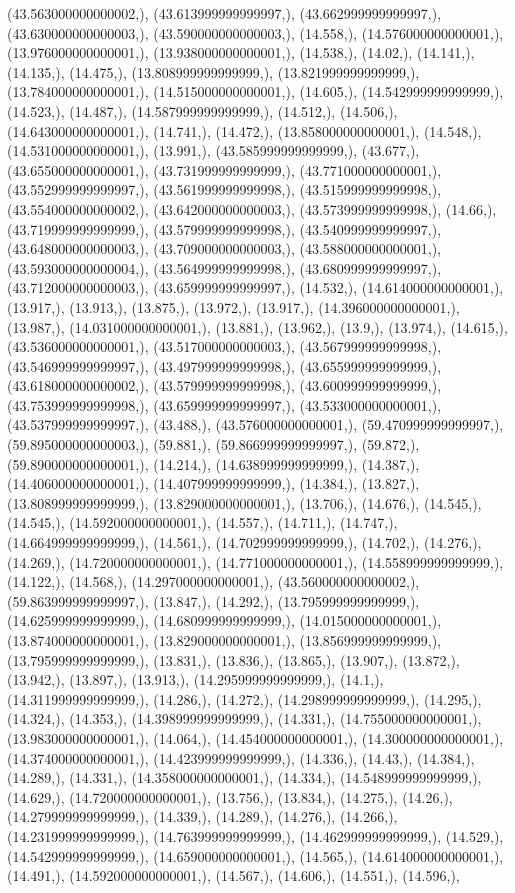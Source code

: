 \documentclass{article}
\begin{document}
(43.563000000000002,), (43.613999999999997,), (43.662999999999997,), (43.630000000000003,), (43.590000000000003,), (14.558,), (14.576000000000001,), (13.976000000000001,), (13.938000000000001,), (14.538,), (14.02,), (14.141,), (14.135,), (14.475,), (13.808999999999999,), (13.821999999999999,), (13.784000000000001,), (14.515000000000001,), (14.605,), (14.542999999999999,), (14.523,), (14.487,), (14.587999999999999,), (14.512,), (14.506,), (14.643000000000001,), (14.741,), (14.472,), (13.858000000000001,), (14.548,), (14.531000000000001,), (13.991,), (43.585999999999999,), (43.677,), (43.655000000000001,), (43.731999999999999,), (43.771000000000001,), (43.552999999999997,), (43.561999999999998,), (43.515999999999998,), (43.554000000000002,), (43.642000000000003,), (43.573999999999998,), (14.66,), (43.719999999999999,), (43.579999999999998,), (43.540999999999997,), (43.648000000000003,), (43.709000000000003,), (43.588000000000001,), (43.593000000000004,), (43.564999999999998,), (43.680999999999997,), (43.712000000000003,), (43.659999999999997,), (14.532,), (14.614000000000001,), (13.917,), (13.913,), (13.875,), (13.972,), (13.917,), (14.396000000000001,), (13.987,), (14.031000000000001,), (13.881,), (13.962,), (13.9,), (13.974,), (14.615,), (43.536000000000001,), (43.517000000000003,), (43.567999999999998,), (43.546999999999997,), (43.497999999999998,), (43.655999999999999,), (43.618000000000002,), (43.579999999999998,), (43.600999999999999,), (43.753999999999998,), (43.659999999999997,), (43.533000000000001,), (43.537999999999997,), (43.488,), (43.576000000000001,), (59.470999999999997,), (59.895000000000003,), (59.881,), (59.866999999999997,), (59.872,), (59.890000000000001,), (14.214,), (14.638999999999999,), (14.387,), (14.406000000000001,), (14.407999999999999,), (14.384,), (13.827,), (13.808999999999999,), (13.829000000000001,), (13.706,), (14.676,), (14.545,), (14.545,), (14.592000000000001,), (14.557,), (14.711,), (14.747,), (14.664999999999999,), (14.561,), (14.702999999999999,), (14.702,), (14.276,), (14.269,), (14.720000000000001,), (14.771000000000001,), (14.558999999999999,), (14.122,), (14.568,), (14.297000000000001,), (43.560000000000002,), (59.863999999999997,), (13.847,), (14.292,), (13.795999999999999,), (14.625999999999999,), (14.680999999999999,), (14.015000000000001,), (13.874000000000001,), (13.829000000000001,), (13.856999999999999,), (13.795999999999999,), (13.831,), (13.836,), (13.865,), (13.907,), (13.872,), (13.942,), (13.897,), (13.913,), (14.295999999999999,), (14.1,), (14.311999999999999,), (14.286,), (14.272,), (14.298999999999999,), (14.295,), (14.324,), (14.353,), (14.398999999999999,), (14.331,), (14.755000000000001,), (13.983000000000001,), (14.064,), (14.454000000000001,), (14.300000000000001,), (14.374000000000001,), (14.423999999999999,), (14.336,), (14.43,), (14.384,), (14.289,), (14.331,), (14.358000000000001,), (14.334,), (14.548999999999999,), (14.629,), (14.720000000000001,), (13.756,), (13.834,), (14.275,), (14.26,), (14.279999999999999,), (14.339,), (14.289,), (14.276,), (14.266,), (14.231999999999999,), (14.763999999999999,), (14.462999999999999,), (14.529,), (14.542999999999999,), (14.659000000000001,), (14.565,), (14.614000000000001,), (14.491,), (14.592000000000001,), (14.567,), (14.606,), (14.551,), (14.596,), 
\end{document}
